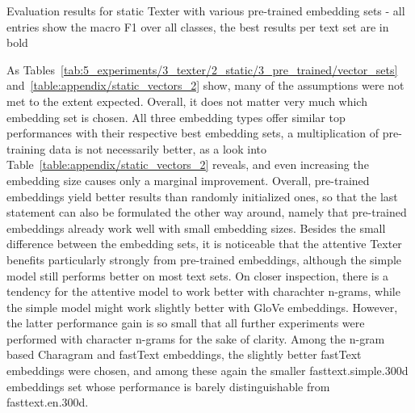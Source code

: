 \begin{table}[t]
    \makebox[\textwidth][c]{
        
    }
    \caption{Evaluation results for static Texter with various pre-trained embedding sets - all entries show the macro F1 over all classes, the best results per text set are in bold}
    \label{tab:5_experiments/3_texter/2_static/3_pre_trained/grid_search}
\end{table}

As Tables~\ref{tab:5_experiments/3_texter/2_static/3_pre_trained/vector_sets} and~\ref{table:appendix/static_vectors_2} show, many of the assumptions were not met to the extent expected. Overall, it does not matter very much which embedding set is chosen. All three embedding types offer similar top performances with their respective best embedding sets, a multiplication of pre-training data is not necessarily better, as a look into Table~\ref{table:appendix/static_vectors_2} reveals, and even increasing the embedding size causes only a marginal improvement. Overall, pre-trained embeddings yield better results than randomly initialized ones, so that the last statement can also be formulated the other way around, namely that pre-trained embeddings already work well with small embedding sizes. Besides the small difference between the embedding sets, it is noticeable that the attentive Texter benefits particularly strongly from pre-trained embeddings, although the simple model still performs better on most text sets. On closer inspection, there is a tendency for the attentive model to work better with charachter n-grams, while the simple model might work slightly better with GloVe embeddings. However, the latter performance gain is so small that all further experiments were performed with character n-grams for the sake of clarity. Among the n-gram based Charagram and fastText embeddings, the slightly better fastText embeddings were chosen, and among these again the smaller fasttext.simple.300d embeddings set whose performance is barely distinguishable from fasttext.en.300d.
